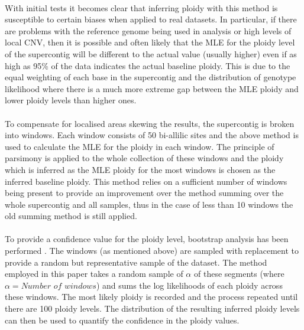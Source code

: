 \documentclass[11pt]{article}
\begin{document}
\paragraph{}With initial tests it becomes clear that inferring ploidy with this method is susceptible to certain biases when applied to real datasets. In particular, if there are problems with the reference genome being used in analysis or high levels of local CNV, then it is possible and often likely that the MLE for the ploidy level of the supercontig will be different to the actual value (usually higher) even if as high as 95\% of the data indicates the actual baseline ploidy. This is due to the equal weighting of each base in the supercontig and the distribution of genotype likelihood where there is a much more extreme gap between the MLE ploidy and lower ploidy levels than higher ones. 
\paragraph{}To compensate for localised areas skewing the results, the supercontig is broken into windows. Each window consists of 50 bi-allilic sites and the above method is used to calculate the MLE for the ploidy in each window. The principle of parsimony is applied to the whole collection of these windows and the ploidy which is inferred as the MLE ploidy for the most windows is chosen as the inferred baseline ploidy. This method relies on a sufficient number of windows being present to provide an improvement over the method summing over the whole supercontig and all samples, thus in the case of less than 10 windows the old summing method is still applied.  

\paragraph{}To provide a confidence value for the ploidy level, bootstrap analysis has been performed \autocite{Davison1997}. The windows (as mentioned above) are sampled with replacement to provide a random but representative sample of the dataset. The method employed in this paper takes a random sample of $\alpha$ of these segments (where $\alpha = \textit{Number of windows}$) and sums the log likelihoods of each ploidy across these windows. The most likely ploidy is recorded and the process repeated until there are 100 ploidy levels. The distribution of the resulting inferred ploidy levels can then be used to quantify the confidence in the ploidy values. 
\end{document}
